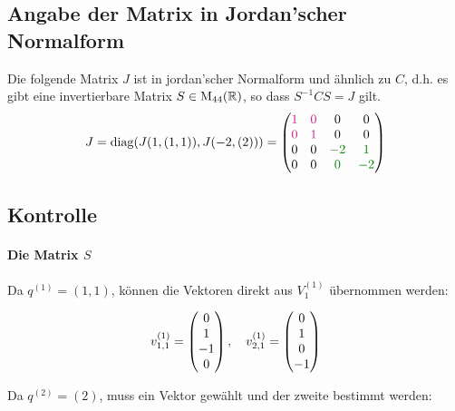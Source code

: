 \documentclass{article}
\begin{document}
\subsection*{Angabe der Matrix in Jordan'scher Normalform}
Die folgende Matrix $J$ ist in jordan'scher Normalform und ähnlich zu $C$, d.h. es gibt eine invertierbare Matrix $S\in \mathrm M_{44}(\mathbb{R})$, so dass $S^{-1}CS = J$ gilt.
\begin{align*}
J = \diag(J(1,(1,1)), J(-2,(2))) = \mat{{\color{MediumVioletRed}1}&{\color{MediumVioletRed}0}&0&0\\{\color{MediumVioletRed}0}&{\color{MediumVioletRed}1}&0&0\\0&0&{\color{Green}-2}&{\color{Green}1}\\0&0&{\color{Green}0}&{\color{Green}-2}}
\end{align*}


\newpage
\subsection*{Kontrolle}
\paragraph{Die Matrix $S$} Da $q^{(1)} = (1,1)$, können die Vektoren direkt aus $V_1^{(1)}$ übernommen werden:


\[v_{1,1}^{(1)} = \begin{pmatrix}0\\1\\-1\\0\end{pmatrix}, \quad v_{2,1}^{(1)} = \begin{pmatrix}0\\1\\0\\-1\end{pmatrix}\]

Da $q^{(2)} = (2)$, muss ein Vektor gewählt und der zweite bestimmt werden:

\end{document}
